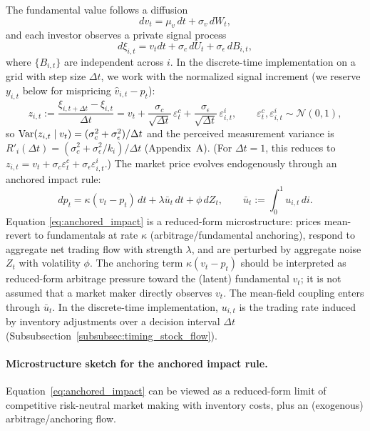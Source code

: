 The fundamental value follows a diffusion
\begin{equation}
dv_t = \mu_v\,dt + \sigma_v\,dW_t,
\end{equation}
and each investor observes a private signal process
 \begin{equation}
 d\xi_{i,t} = v_t dt + \sigma_c\,dU_t + \sigma_\epsilon\,dB_{i,t},
 \end{equation}
 where $\{B_{i,t}\}$ are independent across $i$.
 In the discrete-time implementation on a grid with step size $\Delta t$, we work with the normalized signal increment (we reserve $y_{i,t}$ below for mispricing $\hat v_{i,t}-p_t$):
 \[
 z_{i,t}:=\frac{\xi_{i,t+\Delta t}-\xi_{i,t}}{\Delta t}
 = v_t+\frac{\sigma_c}{\sqrt{\Delta t}}\,\varepsilon^c_t+\frac{\sigma_\epsilon}{\sqrt{\Delta t}}\,\varepsilon^i_{i,t},
 \qquad \varepsilon^c_t,\varepsilon^i_{i,t}\sim\mathcal N(0,1),
 \]
 so $\text{Var}(z_{i,t}\mid v_t)=(\sigma_c^2+\sigma_\epsilon^2)/\Delta t$ and the perceived measurement variance is
 $R'_i(\Delta t)=(\sigma_c^2+\sigma_\epsilon^2/k_i)/\Delta t$ (Appendix~A). (For $\Delta t=1$, this reduces to
 $z_{i,t}=v_t+\sigma_c\varepsilon^c_t+\sigma_\epsilon\varepsilon^i_{i,t}$.)
The market price evolves endogenously through an anchored impact rule:
\begin{equation}
dp_t = \kappa (v_t - p_t)\,dt + \lambda \bar u_t\,dt + \phi\,dZ_t,\qquad \bar u_t := \int_0^1 u_{i,t}\,di.
\label{eq:anchored_impact}
\end{equation}
Equation \eqref{eq:anchored_impact} is a reduced-form microstructure: prices mean-revert to fundamentals at rate $\kappa$ (arbitrage/fundamental anchoring), respond to aggregate net trading flow with strength $\lambda$, and are perturbed by aggregate noise $Z_t$ with volatility $\phi$.
The anchoring term $\kappa(v_t-p_t)$ should be interpreted as reduced-form arbitrage pressure toward the (latent) fundamental $v_t$; it is not assumed that a market maker directly observes $v_t$.
The mean-field coupling enters through $\bar u_t$.
In the discrete-time implementation, $u_{i,t}$ is the trading rate induced by inventory adjustments over a decision interval $\Delta t$ (Subsubsection~\ref{subsubsec:timing_stock_flow}).

\paragraph{Microstructure sketch for the anchored impact rule.}
Equation~\eqref{eq:anchored_impact} can be viewed as a reduced-form limit of competitive
risk-neutral market making with inventory costs, plus an (exogenous) arbitrage/anchoring flow.

